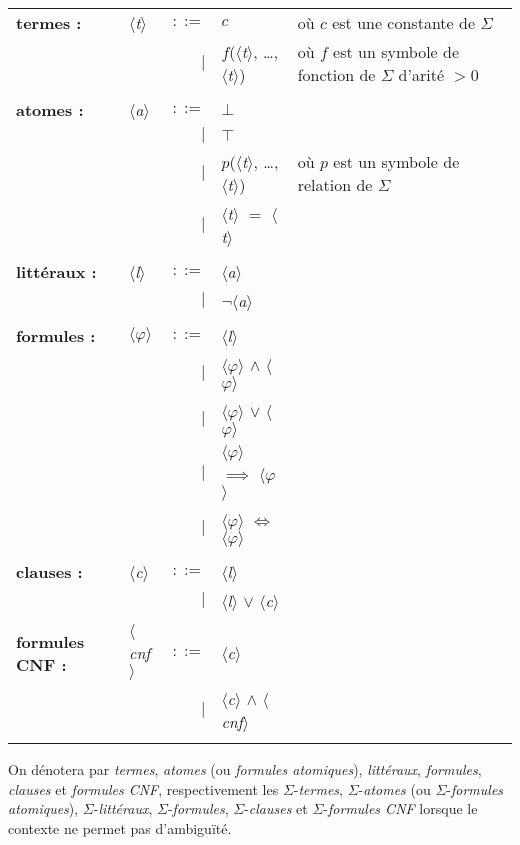 \documentclass[a4paper, twoside]{scrartcl}
\theoremstyle{plain}%
\theoremstyle{definition}
\theoremstyle{remark}
\newcommand{\nt}[1]{$\langle$\textsl{#1}$\rangle$}
\begin{document}
\begin{center}
\begin{tabular}{llrll}
  \bf{termes :}
  & \nt{t} & $::=$ & $c$ & où $c$ est une constante de $\Sigma$ \\
  &        &   $|$ & $f$(\nt{t}, \ldots, \nt{t}) & où $f$ est un
  symbole de fonction de $\Sigma$ d'arité $> 0$\\\\

  \bf{atomes :}
  & \nt{a} & $::=$ & $\bot$ & \\
  &        &   $|$ & $\top$ & \\
  &        &   $|$ & $p$(\nt{t}, \ldots, \nt{t}) & où $p$ est un
  symbole de relation de $\Sigma$\\
  &        &   $|$ & \nt{t} $=$ \nt{t} & \\\\

  \bf{littéraux :}
  & \nt{l} & $::=$ & \nt{a} & \\
  &        &   $|$ & $\neg$\nt{a} & \\\\

  \bf{formules :}
  & \nt{$\varphi$} & $::=$ & \nt{l} & \\
  &              &   $|$ & \nt{$\varphi$} $\wedge$ \nt{$\varphi$} & \\
  &              &   $|$ & \nt{$\varphi$} $\vee$ \nt{$\varphi$} & \\
  &              &   $|$ & \nt{$\varphi$} $\implies$ \nt{$\varphi$} & \\
  &              &   $|$ & \nt{$\varphi$} $\iff$ \nt{$\varphi$} & \\\\

  \bf{clauses :}
  & \nt{c} & $::=$ & \nt{l} & \\
  &              &   $|$ & \nt{l} $\vee$ \nt{c} & \\\\

  \bf{formules CNF :}
  & \nt{cnf} & $::=$ & \nt{c} & \\
  &              &   $|$ & \nt{c} $\wedge$ \nt{cnf} & \\\\

\end{tabular}
\end{center}

On dénotera par \emph{termes}, \emph{atomes} (ou \emph{formules
  atomiques}), \emph{littéraux}, \emph{formules}, \emph{clauses} et
\emph{formules CNF}, respectivement les $\Sigma$-\emph{termes},
$\Sigma$-\emph{atomes} (ou $\Sigma$-\emph{formules atomiques}),
$\Sigma$-\emph{littéraux}, $\Sigma$-\emph{formules},
$\Sigma$-\emph{clauses} et $\Sigma$-\emph{formules CNF} lorsque le
contexte ne permet pas d'ambiguïté.
\end{document}
